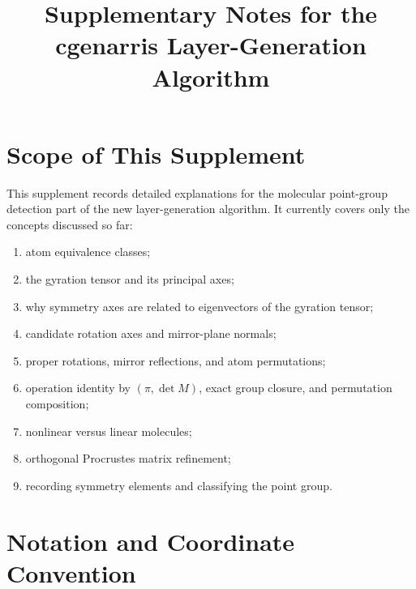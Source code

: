 \documentclass[11pt]{article}
\title{Supplementary Notes for the cgenarris Layer-Generation Algorithm}
\author{}
\date{}
\begin{document}
\maketitle

\section{Scope of This Supplement}

This supplement records detailed explanations for the molecular point-group
detection part of the new layer-generation algorithm.  It currently covers only
the concepts discussed so far:
\begin{enumerate}[label=(\roman*)]
    \item atom equivalence classes;
    \item the gyration tensor and its principal axes;
    \item why symmetry axes are related to eigenvectors of the gyration tensor;
    \item candidate rotation axes and mirror-plane normals;
    \item proper rotations, mirror reflections, and atom permutations;
    \item operation identity by \((\pi,\det M)\), exact group closure, and
    permutation composition;
    \item nonlinear versus linear molecules;
    \item orthogonal Procrustes matrix refinement;
    \item recording symmetry elements and classifying the point group.
\end{enumerate}

\section{Notation and Coordinate Convention}
\end{document}
